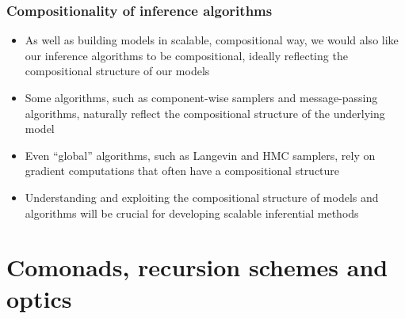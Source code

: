\documentclass[mathserif,handout]{beamer}
\begin{document}

\begin{frame}
  \frametitle{Compositionality of inference algorithms}
  \begin{itemize}
  \item As well as building \alert{models} in scalable, compositional way, we would also like our \alert{inference algorithms} to be compositional, ideally reflecting the compositional structure of our models
  \item Some algorithms, such as component-wise samplers and message-passing algorithms, naturally reflect the compositional structure of the underlying model
  \item Even ``global'' algorithms, such as Langevin and HMC samplers, rely on gradient computations that often have a compositional structure
    \item Understanding and exploiting the \alert{compositional structure} of models and algorithms will be crucial for developing scalable inferential methods
  \end{itemize}
\end{frame}

\section{Comonads, recursion schemes and optics}
\end{document}
